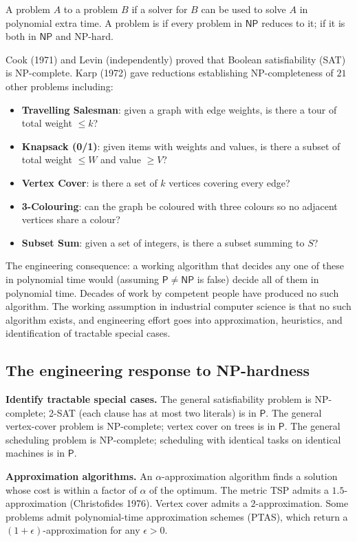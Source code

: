 A problem $A$  to a problem $B$ if a solver for $B$ can be used to solve $A$ in polynomial extra time. A problem is  if every problem in $\mathsf{NP}$ reduces to it;  if it is both in $\mathsf{NP}$ and NP-hard.

Cook (1971) and Levin (independently) proved that Boolean satisfiability (SAT) is NP-complete. Karp (1972) gave reductions establishing NP-completeness of $21$ other problems including:

\begin{itemize}[leftmargin=*]
  \item \textbf{Travelling Salesman}: given a graph with edge weights, is there a tour of total weight $\leq k$?
  \item \textbf{Knapsack (0/1)}: given items with weights and values, is there a subset of total weight $\leq W$ and value $\geq V$?
  \item \textbf{Vertex Cover}: is there a set of $k$ vertices covering every edge?
  \item \textbf{3-Colouring}: can the graph be coloured with three colours so no adjacent vertices share a colour?
  \item \textbf{Subset Sum}: given a set of integers, is there a subset summing to $S$?
\end{itemize}

The engineering consequence: a working algorithm that decides any one of these in polynomial time would (assuming $\mathsf{P} \neq \mathsf{NP}$ is false) decide all of them in polynomial time. Decades of work by competent people have produced no such algorithm. The working assumption in industrial computer science is that no such algorithm exists, and engineering effort goes into approximation, heuristics, and identification of tractable special cases.

\subsection{The engineering response to NP-hardness}

\textbf{Identify tractable special cases.} The general satisfiability problem is NP-complete; 2-SAT (each clause has at most two literals) is in $\mathsf{P}$. The general vertex-cover problem is NP-complete; vertex cover on trees is in $\mathsf{P}$. The general scheduling problem is NP-complete; scheduling with identical tasks on identical machines is in $\mathsf{P}$.

\textbf{Approximation algorithms.} An $\alpha$-approximation algorithm finds a solution whose cost is within a factor of $\alpha$ of the optimum. The metric TSP admits a $1.5$-approximation (Christofides 1976). Vertex cover admits a $2$-approximation. Some problems admit polynomial-time approximation schemes (PTAS), which return a $(1 + \epsilon)$-approximation for any $\epsilon > 0$.

